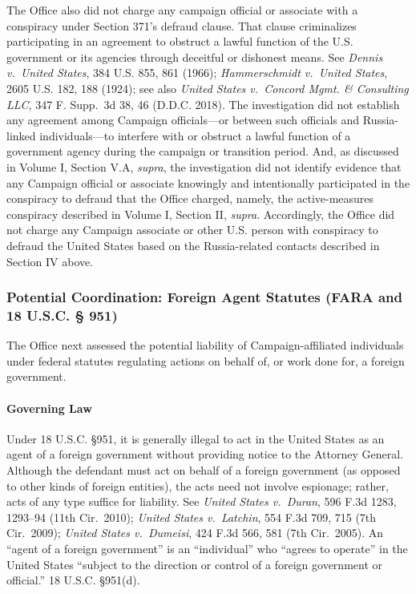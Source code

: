 The Office also did not charge any campaign official or associate with a conspiracy under Section 371's defraud clause.
That clause criminalizes participating in an agreement to obstruct a lawful function of the U.S. government or its agencies through deceitful or dishonest means.
See \textit{Dennis v.\ United States}, 384 U.S. 855, 861 (1966); \textit{Hammerschmidt v.\ United States}, 2605 U.S. 182, 188 (1924); see also \textit{United States v.\ Concord Mgmt. \& Consulting LLC}, 347 F. Supp.~3d 38, 46 (D.D.C. 2018).
The investigation did not establish any agreement among Campaign officials---or between such officials and Russia-linked individuals---to interfere with or obstruct a lawful function of a government agency during the campaign or transition period.
And, as discussed in Volume I, Section V.A, \textit{supra}, the investigation did not identify evidence that any Campaign official or associate knowingly and intentionally participated in the conspiracy to defraud that the Office charged, namely, the active-measures conspiracy described in Volume I, Section II, \textit{supra}.
Accordingly, the Office did not charge any Campaign associate or other U.S. person with conspiracy to defraud the United States based on the Russia-related contacts described in Section IV above.

\subsubsection{Potential Coordination: Foreign Agent Statutes (FARA and 18 U.S.C. § 951)}
The Office next assessed the potential liability of Campaign-affiliated individuals under federal statutes regulating actions on behalf of, or work done for, a foreign government.

\paragraph{Governing Law}
Under 18 U.S.C. \S 951, it is generally illegal to act in the United States as an agent of a foreign government without providing notice to the Attorney General.
Although the defendant must act on behalf of a foreign government (as opposed to other kinds of foreign entities), the acts need not involve espionage; rather, acts of any type suffice for liability.
See \textit{United States v.\ Duran}, 596 F.3d 1283, 1293--94 (11th Cir.~2010); \textit{United States v.\ Latchin}, 554 F.3d 709, 715 (7th Cir.~2009); \textit{United States v.\ Dumeisi}, 424 F.3d 566, 581 (7th Cir.~2005).
An ``agent of a foreign government'' is an ``individual'' who ``agrees to operate'' in the United States ``subject to the direction or control of a foreign government or official.'' 18 U.S.C. \S 951(d).

